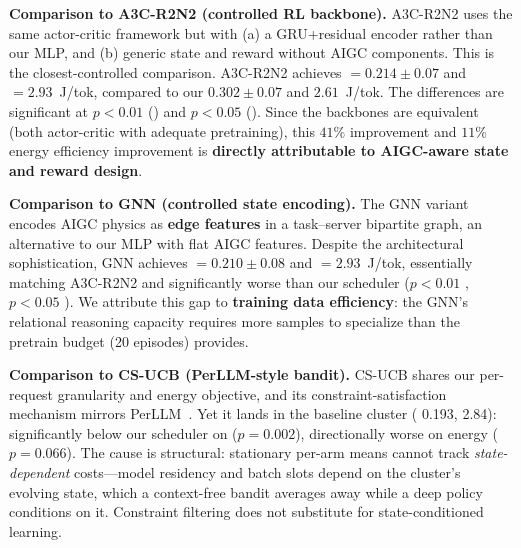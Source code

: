 \textbf{Comparison to A3C-R2N2 (controlled RL backbone).}
A3C-R2N2 uses the same actor-critic framework but with (a) a
GRU+residual encoder rather than our MLP, and (b) generic
state and reward without AIGC components. This is the
closest-controlled comparison. A3C-R2N2 achieves \slo${} =
0.214 \pm 0.07$ and \etok${} = 2.93$~J/tok, compared to our
$0.302 \pm 0.07$ and $2.61$~J/tok. The differences are
significant at $p<0.01$ (\slo) and $p<0.05$ (\etok). Since the
backbones are equivalent (both actor-critic with adequate
pretraining), this $41\%$ \slo{} improvement and $11\%$
energy efficiency improvement is \textbf{directly attributable
to AIGC-aware state and reward design}.

\textbf{Comparison to GNN (controlled state encoding).} The
GNN variant encodes AIGC physics as \textbf{edge features} in
a task--server bipartite graph, an alternative to our MLP
with flat AIGC features. Despite the architectural
sophistication, GNN achieves \slo${} = 0.210 \pm 0.08$ and
\etok${} = 2.93$~J/tok, essentially matching A3C-R2N2 and
significantly worse than our scheduler ($p<0.01$ \slo,
$p<0.05$ \etok). We attribute this gap to \textbf{training
data efficiency}: the GNN's relational reasoning capacity
requires more samples to specialize than the pretrain budget
(20 episodes) provides.

\textbf{Comparison to CS-UCB (PerLLM-style bandit).} CS-UCB
shares our per-request granularity and energy objective, and
its constraint-satisfaction mechanism mirrors
PerLLM~\cite{yang2024perllm}. Yet it lands in the
baseline cluster (\slo{} 0.193, \etok{} 2.84): significantly
below our scheduler on \slo{} ($p{=}0.002$), directionally
worse on energy ($p{=}0.066$). The cause is structural:
stationary per-arm means cannot track
\emph{state-dependent} costs---model residency and batch
slots depend on the cluster's evolving
state, which a context-free bandit averages away while a deep
policy conditions on it. Constraint filtering does not
substitute for state-conditioned learning.

